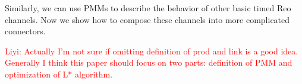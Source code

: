 \documentclass[conference, a4paper]{IEEEtran}
\newcommand{\liyi}[1]{\textcolor{red}{Liyi: {#1}}}
\newtheorem{definition}{Definition}
\newcommand{\rblock}[0]{\circleddash}
\newcommand{\rempty}[0]{\varnothing}
\begin{document}
Similarly, we can use PMMs to describe the behavior of other basic timed Reo
channels. Now we show how to compose these channels into more complicated connectors.

\liyi{Actually I'm not sure if omitting definition of prod and link is a good idea. Generally I
think this paper should focus on two parts: definition of PMM and optimization of L* algorithm.}

\end{document}
